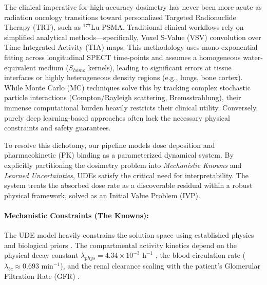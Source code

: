 \documentclass[10pt,letterpaper]{article}
\begin{document}
The clinical imperative for high-accuracy dosimetry has never been more acute as radiation oncology transitions toward personalized Targeted Radionuclide Therapy (TRT), such as $^{177}$Lu-PSMA. Traditional clinical workflows rely on simplified analytical methods---specifically, Voxel S-Value (VSV) convolution over Time-Integrated Activity (TIA) maps. This methodology uses mono-exponential fitting across longitudinal SPECT time-points and assumes a homogeneous water-equivalent medium ($S_{homo}$ kernels), leading to significant errors at tissue interfaces or highly heterogeneous density regions (e.g., lungs, bone cortex). While Monte Carlo (MC) techniques solve this by tracking complex stochastic particle interactions (Compton/Rayleigh scattering, Bremsstrahlung), their immense computational burden heavily restricts their clinical utility. Conversely, purely deep learning-based approaches often lack the necessary physical constraints and safety guarantees.

To resolve this dichotomy, our pipeline models dose deposition and pharmacokinetic (PK) binding as a parameterized dynamical system. By explicitly partitioning the dosimetry problem into \textit{Mechanistic Knowns} and \textit{Learned Uncertainties}, UDEs satisfy the critical need for interpretability. The system treats the absorbed dose rate as a discoverable residual within a robust physical framework, solved as an Initial Value Problem (IVP).

\paragraph{Mechanistic Constraints (The Knowns):}
The UDE model heavily constrains the solution space using established physics and biological priors \cite{KennedyLugassi2020}. The compartmental activity kinetics depend on the physical decay constant $\lambda_{phys} = 4.34 \times 10^{-3} \text{ h}^{-1}$ \cite{ReschFouladgar2023, StabinMadsen2019}, the blood circulation rate ($\lambda_{bc} \approx 0.693 \text{ min}^{-1}$), and the renal clearance scaling with the patient's Glomerular Filtration Rate (GFR) \cite{HardiansyahYousefzadehNowshahr2024}.
\end{document}
